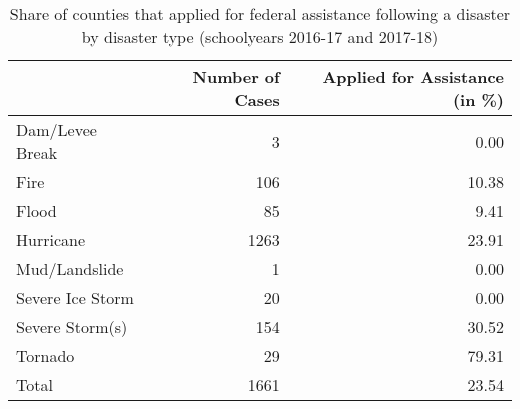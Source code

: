 \begin{table}

\caption{\label{tab:AppsByType}Share of counties that applied for federal assistance following a disaster by disaster type (schoolyears 2016-17 and 2017-18)}
\centering
\begin{tabular}[t]{lrr}
\toprule
  & Number of Cases & Applied for Assistance (in \%)\\
\midrule
Dam/Levee Break & 3 & 0.00\\
Fire & 106 & 10.38\\
Flood & 85 & 9.41\\
Hurricane & 1263 & 23.91\\
Mud/Landslide & 1 & 0.00\\
\addlinespace
Severe Ice Storm & 20 & 0.00\\
Severe Storm(s) & 154 & 30.52\\
Tornado & 29 & 79.31\\
Total & 1661 & 23.54\\
\bottomrule
\end{tabular}
\end{table}
